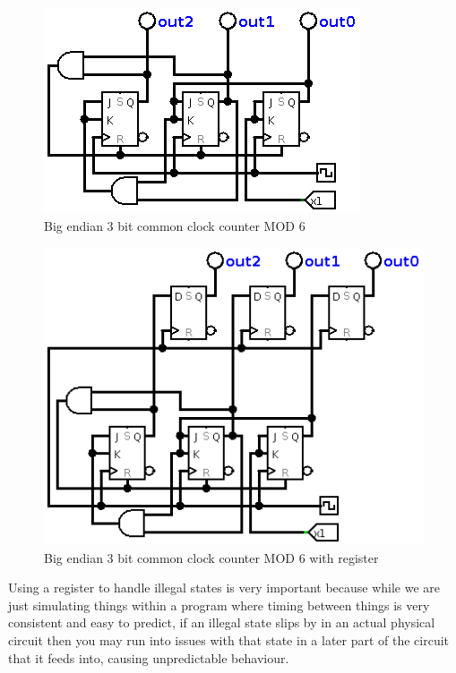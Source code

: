 \documentclass[11pt]{scrartcl}
\begin{document}
\pagebreak

\begin{figure}[h]
    \centering
    \includegraphics[scale=0.5]{images/bigendian3bitcommonclockcountermod6.png}
    \caption{Big endian 3 bit common clock counter MOD 6}
\end{figure}

\begin{figure}[h]
    \centering
    \includegraphics[scale=0.5]{images/bigendian3bitcommonclockcountermod6withregister.png}
    \caption{Big endian 3 bit common clock counter MOD 6 with register}
\end{figure}

Using a register to handle illegal states is very important because while we are
just simulating things within a program where timing between things is very consistent
and easy to predict, if an illegal state slips by in an actual physical circuit then
you may run into issues with that state in a later part of the circuit that it feeds into,
causing unpredictable behaviour.

\pagebreak
\end{document}
